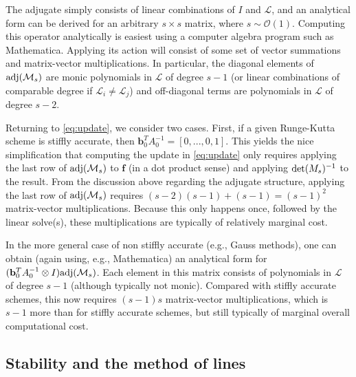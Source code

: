 \documentclass[review]{siamart}
\begin{document}
The adjugate simply consists of linear combinations of $I$ and $\mathcal{L}$, and an
analytical form can be derived for an arbitrary $s\times s$ matrix, where $s\sim\mathcal{O}(1)$.
Computing this operator analytically is easiest using a computer algebra program
such as Mathematica. Applying its action will consist of some set of vector summations
and matrix-vector multiplications. In particular, the diagonal elements of
$\textnormal{adj}(\mathcal{M}_s)$ are monic polynomials in $\mathcal{L}$ of degree
$s-1$ (or linear combinations of comparable degree if $\mathcal{L}_i\neq\mathcal{L}_j$)
and off-diagonal terms are polynomials in $\mathcal{L}$ of degree $s-2$. 

Returning to \eqref{eq:update}, we consider two cases. First, if a given Runge-Kutta
scheme is stiffly accurate, then $\mathbf{b}_0^TA_0^{-1} = [0,...,0,1]$. This yields
the nice simplification that computing the update in \eqref{eq:update} only requires
applying the last row of $\textnormal{adj}(\mathcal{M}_s)$ to $\mathbf{f}$ (in a
dot product sense) and applying $\textnormal{det}({M}_s)^{-1}$ to the result. From
the discussion above regarding the adjugate structure, applying the last row of
$\textnormal{adj}(\mathcal{M}_s)$ requires $(s-2)(s-1) + (s-1) = (s-1)^2$ matrix-vector
multiplications. Because this only happens once, followed by the linear solve(s),
these multiplications are typically of relatively marginal cost.

In the more general case of non stiffly accurate (e.g., Gauss methods), one can
obtain (again using, e.g., Mathematica) an analytical form for
$(\mathbf{b}_0^TA_0^{-1}\otimes I)\textnormal{adj}(\mathcal{M}_s)$. Each element in
this matrix consists of polynomials in $\mathcal{L}$ of degree $s-1$ (although
typically not monic). Compared with stiffly accurate schemes, this now requires 
$(s-1)s$ matrix-vector multiplications, which is $s-1$ more than for stiffly
accurate schemes, but still typically of marginal overall computational cost. 

\subsection{Stability and the method of lines}
\end{document}
